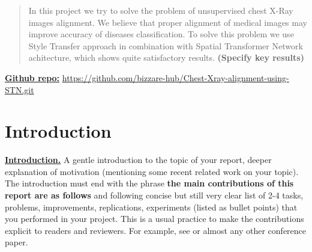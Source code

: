 \documentclass{article}
\begin{document}
\printAffiliationsAndNotice{}  %
\begin{abstract}

In this project we try to solve the problem of unsupervised chest X-Ray images alignment. We believe that proper alignment of medical images may improve accuracy of diseases classification. To solve this problem we use Style Transfer approach in combination with Spatial Transformer Network achitecture, which shows quite satisfactory results. \textbf{(Specify key results)}

\end{abstract}

\underline{\textbf{Github repo:}} \href{https://github.com/bizzare-hub/Chest-Xray-alignment-using-STN.git}{https://github.com/bizzare-hub/Chest-Xray-alignment-using-STN.git}\newline

\section{Introduction}\label{introduction}

\underline{\textbf{Introduction.}} A gentle introduction to the topic of your report, deeper explanation of motivation (mentioning some recent related work on your topic). The introduction must end with the phrase \textbf{the main contributions of this report are as follows} and following concise but still very clear list of 2-4 tasks, problems, improvements, replications, experiments (listed as bullet points) that you performed in your project. This is a usual practice to make the contributions explicit to readers and reviewers. For example, see \cite{arjovsky2017wasserstein,NIPS20198433} or almost any other conference paper.
\end{document}
